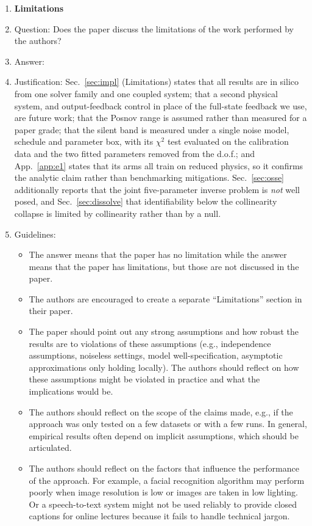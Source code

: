 \begin{enumerate}
\item {\bf Limitations}
    \item[] Question: Does the paper discuss the limitations of the work performed by the authors?
    \item[] Answer: \answerYes{} %
    \item[] Justification: Sec.~\ref{sec:impl} (Limitations) states that all results are in silico from one solver family and one coupled system; that a second physical system, and output-feedback control in place of the full-state feedback we use, are future work; that the Posnov range is assumed rather than measured for a paper grade; that the silent band is measured under a single noise model, schedule and parameter box, with its $\chi^2$ test evaluated on the calibration data and the two fitted parameters removed from the d.o.f.; and App.~\ref{app:e1} states that its arms all train on reduced physics, so it confirms the analytic claim rather than benchmarking mitigations. Sec.~\ref{sec:osse} additionally reports that the joint five-parameter inverse problem is \emph{not} well posed, and Sec.~\ref{sec:dissolve} that identifiability below the collinearity collapse is limited by collinearity rather than by a null.
    \item[] Guidelines:
    \begin{itemize}
        \item The answer \answerNA{} means that the paper has no limitation while the answer \answerNo{} means that the paper has limitations, but those are not discussed in the paper. 
        \item The authors are encouraged to create a separate ``Limitations'' section in their paper.
        \item The paper should point out any strong assumptions and how robust the results are to violations of these assumptions (e.g., independence assumptions, noiseless settings, model well-specification, asymptotic approximations only holding locally). The authors should reflect on how these assumptions might be violated in practice and what the implications would be.
        \item The authors should reflect on the scope of the claims made, e.g., if the approach was only tested on a few datasets or with a few runs. In general, empirical results often depend on implicit assumptions, which should be articulated.
        \item The authors should reflect on the factors that influence the performance of the approach. For example, a facial recognition algorithm may perform poorly when image resolution is low or images are taken in low lighting. Or a speech-to-text system might not be used reliably to provide closed captions for online lectures because it fails to handle technical jargon.

\end{itemize}
\end{enumerate}
